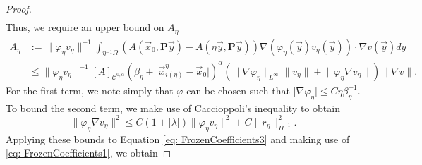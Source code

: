 \documentclass[10pt,a4paper]{amsart}
\begin{document}
\begin{proof}
\begin{equation}
\begin{aligned}
        \end{aligned}
    \end{equation}
    Thus, we require an upper bound on $A_\eta$
    \begin{equation}\label{eq: FrozenCoefficients3}
        \begin{aligned}
            A_\eta&:=\lVert \varphi_\eta v_\eta\rVert^{-1}\int_{\eta^{-1}\Omega}\left(A\left( \vec{x}_0, \textbf{P}\vec{y}\right)-A\left( \eta\vec{y}, \textbf{P}\vec{y}\right)\right)\nabla  (\varphi_\eta(\vec{y})v_\eta(\vec{y})) \cdot \nabla \overline{v}(\vec{y})dy\\
            &\leq \lVert \varphi_\eta v_\eta\rVert^{-1}[A]_{\mathcal{C}^{0,\alpha}}(\beta_\eta + \lvert \vec{x}_{i(\eta)}^\eta-\vec{x}_0\rvert)^\alpha(\lVert \nabla \varphi_\eta \rVert_{L^\infty}\lVert v_\eta\rVert + \lVert \varphi_\eta \nabla v_\eta\rVert)\lVert\nabla  v\rVert.
        \end{aligned}
    \end{equation}
    For the first term, we note simply that $\varphi$ can be chosen such that $\lvert \nabla \varphi_\eta\rvert \leq C\eta\beta_\eta^{-1}$. To bound the second term, we make use of Caccioppoli's inequality to obtain 
    \begin{equation}
        \lVert \varphi_\eta \nabla v_\eta \rVert^2 \leq C(1 + \lvert \lambda\rvert) \lVert \varphi_\eta v_\eta\rVert^2 + C\lVert r_\eta\rVert_{H^{-1}}^2.   
    \end{equation}
    Applying these bounds to Equation \eqref{eq: FrozenCoefficients3} and making use of \eqref{eq: FrozenCoefficients1}, we obtain 


\end{proof}
\end{document}
